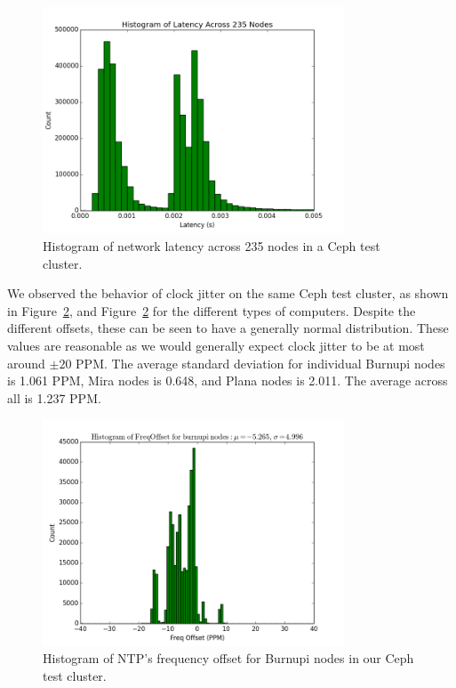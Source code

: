 \begin{figure}[h]
  \centering
  \caption{Histogram of network latency across 235 nodes in a Ceph test cluster.} 
  \label{fig:latency-hist}
  \includegraphics[width=0.8\textwidth]{latency-hist.png}
\end{figure}


We observed the behavior of clock jitter on the same Ceph test
cluster, as shown in Figure~\ref{fig:burnupi-hist}, and Figure~\ref{fig:burnupi-hist} for the different types of
computers. Despite the different offsets, these can be seen to have a
generally normal distribution. These values are reasonable as we would
generally expect clock jitter to be at most around $\pm 20$ PPM. The average
standard deviation for individual Burnupi nodes is 1.061 PPM, Mira
nodes is 0.648, and Plana nodes is 2.011. The average across all is
1.237 PPM.


\begin{figure}[h]
  \label{fig:burnupi-hist}
  \caption{Histogram of NTP's frequency offset for Burnupi nodes in our Ceph test cluster.}
  \centering
  \includegraphics[width=0.8\textwidth]{burnupi-freq-offset.png}
\end{figure}

